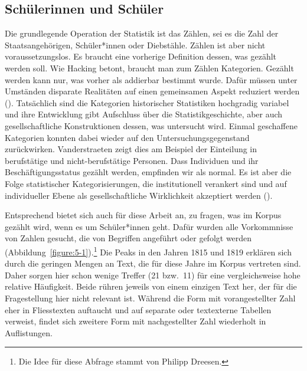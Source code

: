 \subsection{Schülerinnen und Schüler}

Die grundlegende Operation der Statistik ist das Zählen, sei es die Zahl der Staatsangehörigen, Schüler*innen oder Diebstähle. Zählen ist aber nicht voraussetzungslos. Es braucht eine vorherige Definition dessen, was gezählt werden soll. Wie Hacking betont, braucht man zum Zählen Kategorien. Gezählt werden kann nur, was vorher als addierbar bestimmt wurde. Dafür müssen unter Umständen disparate Realitäten auf einen gemeinsamen Aspekt reduziert werden (\cite[280]{hacking_biopower_1982}). Tatsächlich sind die Kategorien historischer Statistiken hochgradig variabel und ihre Entwicklung gibt Aufschluss über die Statistikgeschichte, aber auch gesellschaftliche Konstruktionen dessen, was untersucht wird. Einmal geschaffene Kategorien konnten dabei wieder auf den Untersuchungsgegenstand zurückwirken. Vanderstraeten zeigt dies am Beispiel der Einteilung in berufstätige und nicht-berufstätige Personen. Dass Individuen und ihr Beschäftigungsstatus gezählt werden, empfinden wir als normal. Es ist aber die Folge statistischer Kategorisierungen, die institutionell verankert sind und auf individueller Ebene als gesellschaftliche Wirklichkeit akzeptiert werden (\cite{vanderstraeten_soziale_2006}).

Entsprechend bietet sich auch für diese Arbeit an, zu fragen, was im Korpus gezählt wird, wenn es um Schüler*innen geht. Dafür wurden alle Vorkommnisse von Zahlen gesucht, die von Begriffen angeführt oder gefolgt werden (Abbildung~\ref{figure:5-1}).\footnote{Die Idee für diese Abfrage stammt von Philipp Dreesen.} Die Peaks in den Jahren 1815 und 1819 erklären sich durch die geringen Mengen an Text, die für diese Jahre im Korpus vertreten sind. Daher sorgen hier schon wenige Treffer (21 bzw.~11) für eine vergleichsweise hohe relative Häufigkeit. Beide rühren jeweils von einem einzigen Text her, der für die Fragestellung hier nicht relevant ist. Während die Form mit vorangestellter Zahl eher in Fliesstexten auftaucht und auf separate oder textexterne Tabellen verweist, findet sich zweitere Form mit nachgestellter Zahl wiederholt in Auflistungen. 

